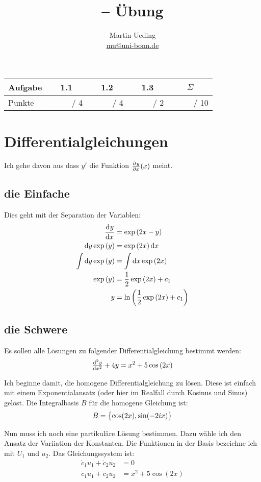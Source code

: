 \documentclass[11pt, ngerman]{article}
\title{\themodul{} -- Übung \theuebung \\ \vspace{0.5cm} \large{\thegruppe}}
\author{Martin Ueding \\ \small{\href{mailto:mu@uni-bonn.de}{mu@uni-bonn.de}}}
\newcommand{\punkte}{\textcolor{white}{xxxxx}}
\begin{document}
\maketitle

\begin{table}[h]
	\centering
	\begin{tabular}{l|c|c|c|c}
		Aufgabe & 1.1 & 1.2 & 1.3 & $\Sigma$   \\
		\hline
		Punkte & \punkte / 4 & \punkte / 4 & \punkte / 2 & \punkte / 10
	\end{tabular}
\end{table}

\section{Differentialgleichungen}

Ich gehe davon aus dass $y'$ die Funktion $\pd yx(x)$ meint.

\subsection{die Einfache}

Dies geht mit der Separation der Variablen:
%
\begin{align*}
	\dod yx &= \exp\del{2x-y} \\
	\dif y \exp\del y &= \exp\del{2x} \dif x \\
	\int \dif y \exp \del y &= \int \dif x \exp\del{2x} \\
	\exp\del y &= \frac 12 \exp\del{2x} + c_1 \\
			 y &= \ln\del{\frac 12 \exp\del{2x} + c_1}
\end{align*}


\subsection{die Schwere}

Es sollen alle Lösungen zu folgender Differentialgleichung bestimmt werden:
\[
	\od[2] yx + 4y = x^2 + 5 \cos\del{2x}
\]

Ich beginne damit, die homogene Differentialgleichung zu lösen. Diese ist
einfach mit einem Exponentialansatz (oder hier im Realfall durch Kosinus und
Sinus) gelöst. Die Integralbasis $B$ für die homogene Gleichung ist:
\[
	B = \set{\cos(2x), \sin(-2ix)}
\]

Nun muss ich noch eine partikuläre Lösung bestimmen. Dazu wähle ich den Ansatz
der Variiation der Konstanten. Die Funktionen in der Basis bezeichne ich mit
$U_1$ und $u_2$. Das Gleichungssystem ist:
\begin{align*}
	\dot c_1 u_1 + \dot c_2 u_2 &= 0 \\
	\dot c_1 \dot u_1 + \dot c_2 \dot u_2 &= x^2 + 5 \cos(2x)
\end{align*}
\end{document}
